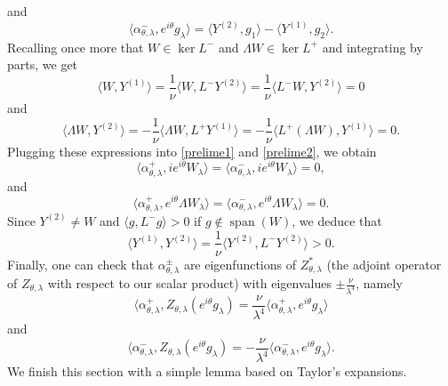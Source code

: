 \documentclass[a4paper,two-side,10pt]{amsart}
\numberwithin{equation}{section}
\DeclareMathOperator{\Span}{span}
\begin{document}
and
\begin{equation}
\label{prelime2}
 \langle \alpha_{\theta ,\lambda}^- , e^{i\theta} g_\lambda \rangle = \langle Y^{(2)} ,g_1\rangle - \langle Y^{(1)} , g_2 \rangle .
\end{equation}
Recalling once more that $W\in \ker L^-$ and $\Lambda W \in \ker L^+$ and integrating by parts, we get
$$\langle W,Y^{(1)} \rangle = \frac{1}{\nu} \langle W , L^- Y^{(2)} \rangle = \frac{1}{\nu} \langle L^- W ,  Y^{(2)} \rangle =0 $$
and
$$\langle \Lambda W,Y^{(2)} \rangle =- \frac{1}{\nu} \langle \Lambda W , L^+ Y^{(1)} \rangle =- \frac{1}{\nu} \langle L^+ (\Lambda W) ,  Y^{(1)} \rangle =0 .$$
Plugging these expressions into \eqref{prelime1} and \eqref{prelime2}, we obtain
$$\langle \alpha_{\theta ,\lambda}^+ , ie^{i\theta } W_\lambda \rangle = \langle \alpha_{\theta ,\lambda}^- , ie^{i\theta } W_\lambda \rangle =0,  $$
and
$$ \langle \alpha_{\theta ,\lambda}^+ , e^{i\theta } \Lambda W_\lambda \rangle =\langle \alpha_{\theta ,\lambda}^- , e^{i\theta } \Lambda W_\lambda \rangle =0. $$
Since $Y^{(2)}\neq W $ and $\langle g ,L^- g \rangle >0$ if $g\notin \Span (W)$, we deduce that
$$\langle Y^{(1)} , Y^{(2)} \rangle = \frac{1}{\nu} \langle Y^{(2)} , L^- Y^{(2)} \rangle >0.$$
Finally, one can check that $\alpha_{\theta ,\lambda}^\pm$ are eigenfunctions of $Z^\ast_{\theta ,\lambda}$ (the adjoint operator of $Z_{\theta ,\lambda}$ with respect to our scalar product) with eigenvalues $\pm \frac{\nu}{\lambda^4}$, namely
\begin{equation}
\label{eigenvprel1}
\langle \alpha_{\theta ,\lambda}^+ , Z_{\theta ,\lambda} (e^{i\theta } g_\lambda ) = \frac{\nu}{\lambda^4} \langle \alpha_{\theta ,\lambda}^+ , e^{i\theta} g_\lambda  \rangle 
\end{equation}
and
\begin{equation}
\label{eigenvprel2}
\langle \alpha_{\theta ,\lambda}^- , Z_{\theta ,\lambda} (e^{i\theta } g_\lambda ) =- \frac{\nu}{\lambda^4} \langle \alpha_{\theta ,\lambda}^- , e^{i\theta} g_\lambda  \rangle.
\end{equation}
We finish this section with a simple lemma based on Taylor's expansions.
\end{document}
